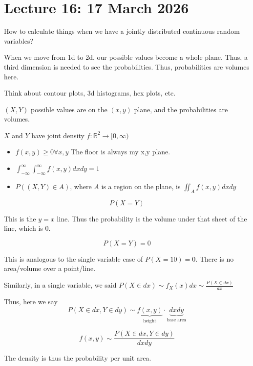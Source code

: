 \documentclass{report}
\begin{document}
\section{Lecture 16: 17 March 2026} 

How to calculate things when we have a jointly distributed continuous random variables?

When we move from 1d to 2d, our possible values become a whole plane. Thus, a third dimension is needed to see the probabilities. Thus, probabilities are volumes here. 

Think about contour plots, 3d histograms, hex plots, etc. 

$ (X,Y) $ possible values are on the $ (x,y) $ plane, and the probabilities are volumes. 


$ X $ and $ Y $ have joint density $ f: \mathbb{R}^{2} \to [0, \infty ) $ 
\begin{itemize}
	\item $ f(x,y) \ge 0 \forall x,y$ 
		The floor is always my x,y plane. 
	\item $ \int_{-\infty}^{\infty}\int_{-\infty}^{\infty}  f(x,y) dx dy = 1$ 
	\item $ P((X,Y) \in A) $, where $ A $ is a region on the plane, is $ \iint_{A}f(x,y)dxdy $ 
\end{itemize}


\[
P(X=Y) 
\]


This is the $ y=x $ line. Thus the probability is the volume under that sheet of the line, which is 0. 

\[
P(X=Y) = 0
\]

This is analogous to the single variable case of $ P(X=10) = 0 $. There is no area/volume over a point/line. 

Similarly, in a single variable, we said $ P(X \in dx) \sim f_{X}(x)dx \sim \frac{P(X \in dx)}{dx} $ 

Thus, here we say 
\[
	P(X \in dx, Y \in dy) \sim \underbrace{f(x,y)}_{\text{height}} \cdot \underbrace{dxdy}_{\text{base area}}
\]

\[
f(x,y) \sim \frac{P(X \in dx, Y \in dy)}{dxdy}
\]

The density is thus the probability per unit area. 
\end{document}
